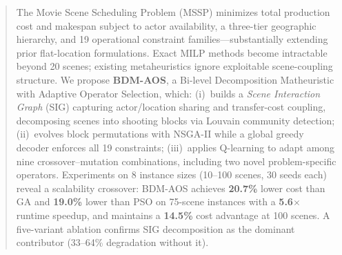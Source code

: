 \begin{abstract}
The Movie Scene Scheduling Problem (MSSP) minimizes total production cost and makespan subject to actor availability, a three-tier geographic hierarchy, and 19 operational constraint families---substantially extending prior flat-location formulations.
Exact MILP methods become intractable beyond 20 scenes; existing metaheuristics ignore exploitable scene-coupling structure.
We propose \textbf{BDM-AOS}, a Bi-level Decomposition Matheuristic with Adaptive Operator Selection, which:
(i)~builds a \emph{Scene Interaction Graph} (SIG) capturing actor/location sharing and transfer-cost coupling, decomposing scenes into shooting blocks via Louvain community detection;
(ii)~evolves block permutations with NSGA-II while a global greedy decoder enforces all 19 constraints;
(iii)~applies Q-learning to adapt among nine crossover--mutation combinations, including two novel problem-specific operators.
Experiments on 8 instance sizes (10--100 scenes, 30 seeds each) reveal a scalability crossover: BDM-AOS achieves \textbf{20.7\%} lower cost than GA and \textbf{19.0\%} lower than PSO on 75-scene instances with a \textbf{5.6$\times$} runtime speedup, and maintains a \textbf{14.5\%} cost advantage at 100 scenes.
A five-variant ablation confirms SIG decomposition as the dominant contributor (33--64\% degradation without it).
\end{abstract}
